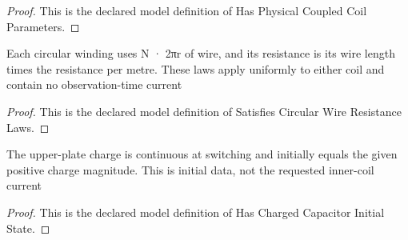 \begin{proof}
  This is the declared model definition of Has Physical Coupled Coil Parameters.
\end{proof}
\begin{definition}
  \label{def:physics:phyx-mini-0978:phyxminiproblems-problemphyxmini0978-satisfiescircularwireresistancelaws}
  Each circular winding uses N · 2πr of wire, and its resistance is its wire length times the resistance per metre. These laws apply uniformly to either coil and contain no observation-time current
\end{definition}
\begin{proof}
  This is the declared model definition of Satisfies Circular Wire Resistance Laws.
\end{proof}
\begin{definition}
  \label{def:physics:phyx-mini-0978:phyxminiproblems-problemphyxmini0978-haschargedcapacitorinitialstate}
  The upper-plate charge is continuous at switching and initially equals the given positive charge magnitude. This is initial data, not the requested inner-coil current
\end{definition}
\begin{proof}
  This is the declared model definition of Has Charged Capacitor Initial State.
\end{proof}
